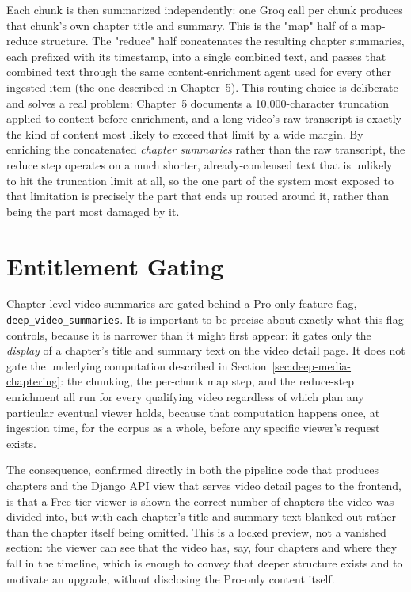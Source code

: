 Each chunk is then summarized independently: one Groq call per chunk produces that chunk's own chapter title and summary. This is the "map" half of a map-reduce structure. The "reduce" half concatenates the resulting chapter summaries, each prefixed with its timestamp, into a single combined text, and passes that combined text through the same content-enrichment agent used for every other ingested item (the one described in Chapter~5). This routing choice is deliberate and solves a real problem: Chapter~5 documents a 10{,}000-character truncation applied to content before enrichment, and a long video's raw transcript is exactly the kind of content most likely to exceed that limit by a wide margin. By enriching the concatenated \emph{chapter summaries} rather than the raw transcript, the reduce step operates on a much shorter, already-condensed text that is unlikely to hit the truncation limit at all, so the one part of the system most exposed to that limitation is precisely the part that ends up routed around it, rather than being the part most damaged by it.

\section{Entitlement Gating}
\label{sec:deep-media-entitlements}

Chapter-level video summaries are gated behind a Pro-only feature flag, \texttt{deep\_video\_summaries}. It is important to be precise about exactly what this flag controls, because it is narrower than it might first appear: it gates only the \emph{display} of a chapter's title and summary text on the video detail page. It does not gate the underlying computation described in Section~\ref{sec:deep-media-chaptering}: the chunking, the per-chunk map step, and the reduce-step enrichment all run for every qualifying video regardless of which plan any particular eventual viewer holds, because that computation happens once, at ingestion time, for the corpus as a whole, before any specific viewer's request exists.

The consequence, confirmed directly in both the pipeline code that produces chapters and the Django API view that serves video detail pages to the frontend, is that a Free-tier viewer is shown the correct number of chapters the video was divided into, but with each chapter's title and summary text blanked out rather than the chapter itself being omitted. This is a locked preview, not a vanished section: the viewer can see that the video has, say, four chapters and where they fall in the timeline, which is enough to convey that deeper structure exists and to motivate an upgrade, without disclosing the Pro-only content itself.

